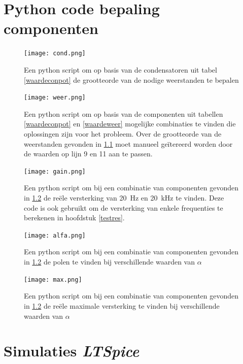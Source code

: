 \documentclass{report}
\begin{document}
\begin{appendices}
\chapter{Python code bepaling componenten}
\label{python}

\begin{figure}[h]
	\centering
	\texttt{[image: cond.png]}
	\caption{Een python script om op basis van de condensatoren uit tabel \ref{waardeconpot} de grootteorde van de nodige weerstanden te bepalen}
	\label{cond}
\end{figure}   

\begin{figure}[h]
	\centering
	\texttt{[image: weer.png]}
	\caption{Een python script om op basis van de componenten uit tabellen \ref{waardeconpot} en \ref{waardeweer} mogelijke combinaties te vinden die oplossingen zijn voor het probleem. Over de grootteorde van de weerstanden gevonden in \ref{cond} moet manueel geïtereerd worden door de waarden op lijn 9 en 11 aan te passen.}
	\label{weer}
\end{figure}   

\begin{figure}[h]
	\centering
	\texttt{[image: gain.png]}
	\caption{Een python script om bij een combinatie van componenten gevonden in \ref{weer} de reële versterking van \SI{20}{\hertz} en \SI{20}{\kilo\hertz} te vinden. Deze code is ook gebruikt om de versterking van enkele frequenties te berekenen in hoofdstuk \ref{testres}.}
	\label{gain}
\end{figure}   

\begin{figure}[h]
	\centering
	\texttt{[image: alfa.png]}
	\caption{Een python script om bij een combinatie van componenten gevonden in \ref{weer} de polen te vinden bij verschillende waarden van $\alpha$}
	\label{alfa}
\end{figure}   

\begin{figure}[h]
	\centering
	\texttt{[image: max.png]}
	\caption{Een python script om bij een combinatie van componenten gevonden in \ref{weer} de reële maximale versterking te vinden bij verschillende waarden van $\alpha$}
	\label{max}
\end{figure}   


\chapter{Simulaties \textit{LTSpice}}
\label{LTSpice}


\end{appendices}
\end{document}
